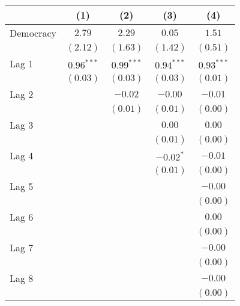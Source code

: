 
\begin{table}
\begin{center}
\begin{tabular}{l c c c c}
\hline
 & (1) & (2) & (3) & (4) \\
\hline
Democracy                       & $2.79$       & $2.29$       & $0.05$       & $1.51$       \\
                                & $(2.12)$     & $(1.63)$     & $(1.42)$     & $(0.51)$     \\
Lag 1                           & $0.96^{***}$ & $0.99^{***}$ & $0.94^{***}$ & $0.93^{***}$ \\
                                & $(0.03)$     & $(0.03)$     & $(0.03)$     & $(0.01)$     \\
Lag 2                           &              & $-0.02$      & $-0.00$      & $-0.01$      \\
                                &              & $(0.01)$     & $(0.01)$     & $(0.00)$     \\
Lag 3                           &              &              & $0.00$       & $0.00$       \\
                                &              &              & $(0.01)$     & $(0.00)$     \\
Lag 4                           &              &              & $-0.02^{*}$  & $-0.01$      \\
                                &              &              & $(0.01)$     & $(0.00)$     \\
Lag 5                           &              &              &              & $-0.00$      \\
                                &              &              &              & $(0.00)$     \\
Lag 6                           &              &              &              & $0.00$       \\
                                &              &              &              & $(0.00)$     \\
Lag 7                           &              &              &              & $-0.00$      \\
                                &              &              &              & $(0.00)$     \\
Lag 8                           &              &              &              & $-0.00$      \\
                                &              &              &              & $(0.00)$     \\

\end{tabular}
\end{center}
\end{table}
